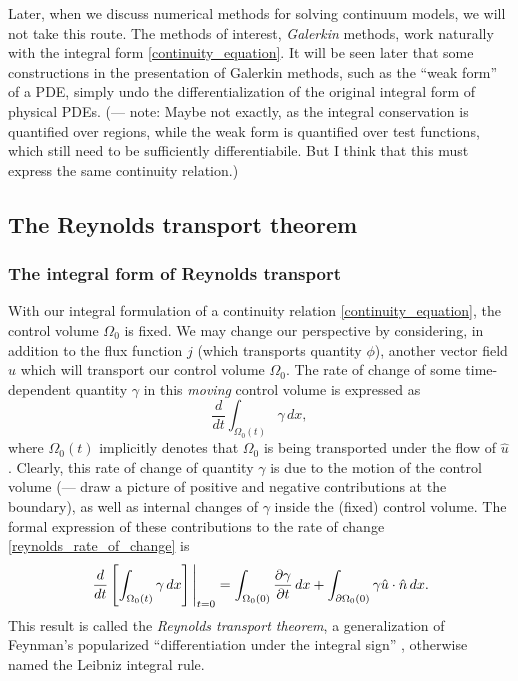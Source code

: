 \documentclass[11pt,a4paper]{memoir}
\newcommand{\Part}[2]{\frac{\partial #1}{\partial #2}}
\begin{document}
Later, when we discuss numerical methods for solving continuum models, we will not take this route. The methods of interest, \textit{Galerkin} methods,
work naturally with the integral form \eqref{continuity_equation}.
It will be seen later that some constructions in the presentation of Galerkin methods, such as the ``weak form'' of a PDE, simply undo the differentialization of the original integral form of physical PDEs.
(--- note: Maybe not exactly, as the integral conservation is quantified over regions, while the weak form is quantified over test functions,
which still need to be sufficiently differentiabile. But I think that this must express the same continuity relation.)

\subsection{The Reynolds transport theorem}
\subsubsection{The integral form of Reynolds transport}
With our integral formulation of a continuity relation \eqref{continuity_equation}, the control volume $\Omega_0$ is fixed.
We may change our perspective by considering, in addition to the flux function $j$ (which transports quantity $\phi$), another
vector field $\hat{u}$ which will transport our control volume $\Omega_0$. The rate of change of some time-dependent quantity $\gamma$ in this
\textit{moving} control volume is expressed as
\begin{equation}\label{reynolds_rate_of_change}
    \frac{d}{dt}\int_{\Omega_0(t)}\gamma\,dx,
\end{equation}
where $\Omega_0(t)$ implicitly denotes that $\Omega_0$ is being transported under the flow of $\hat{u}$.
Clearly, this rate of change of quantity $\gamma$ is due to the motion of the control volume (--- draw a picture of positive and negative contributions at
the boundary), as well as internal changes of $\gamma$ inside the (fixed) control volume.
The formal expression of these contributions to the rate of change \eqref{reynolds_rate_of_change} is
\begin{equation}\label{reynolds_transport_theorem}
    \eval{\frac{d}{dt}\left[\int_{\Omega_0(t)}\gamma\,dx\right]}_{t=0} =
        \int_{\Omega_0(0)}\Part{\gamma}{t}\,dx + \int_{\partial\Omega_0(0)}\gamma \hat{u}\cdot\hat{n} \,dx.
\end{equation}
This result is called the \textit{Reynolds transport theorem},
a generalization of Feynman's popularized ``differentiation under the integral sign'' \cite{feynman_trick},
otherwise named the Leibniz integral rule.
\end{document}
